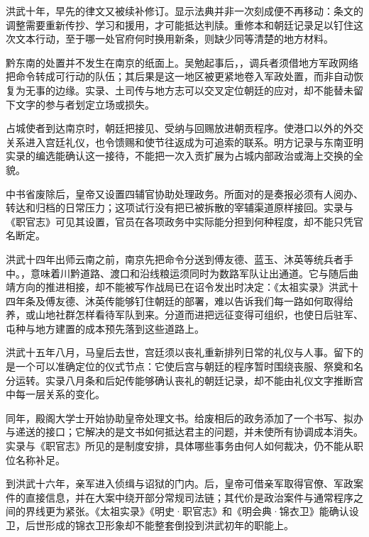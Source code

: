 洪武十年，早先的律文又被续补修订。显示法典并非一次刻成便不再移动：条文的调整需要重新传抄、学习和援用，才可能抵达判牍。重修本和朝廷记录足以钉住这次文本行动，至于哪一处官府何时换用新条，则缺少同等清楚的地方材料。

黔东南的处置并不发生在南京的纸面上。吴勉起事后，，调兵者须借地方军政网络把命令转成可行动的队伍；其后果是这一地区被更紧地卷入军政处置，而非自动恢复为无事的边缘。实录、土司传与地方志可以交叉定位朝廷的应对，却不能替未留下文字的参与者划定立场或损失。

占城使者到达南京时，朝廷把接见、受纳与回赐放进朝贡程序。使港口以外的外交关系进入宫廷礼仪，也令馈赐和使节往返成为可追索的联系。明方记录与东南亚明实录的编选能确认这一接待，不能把一次入贡扩展为占城内部政治或海上交换的全貌。

中书省废除后，皇帝又设置四辅官协助处理政务。所面对的是奏报必须有人阅办、转达和归档的日常压力；这项试行没有把已被拆散的宰辅渠道原样接回。实录与《职官志》可见其设置，官员在各项政务中实际能分担到何种程度，却不能只凭官名断定。

洪武十四年出师云南之前，南京先把命令分送到傅友德、蓝玉、沐英等统兵者手中。，意味着川黔道路、渡口和沿线粮运须同时为数路军队让出通道。它与随后曲靖方向的推进相接，却不能被写作战局已在诏令发出时决定：《太祖实录》洪武十四年条及傅友德、沐英传能够钉住朝廷的部署，难以告诉我们每一路如何取得给养，或山地社群怎样看待军队到来。分道而进把远征变得可组织，也使日后驻军、屯种与地方建置的成本预先落到这些道路上。

洪武十五年八月，马皇后去世，宫廷须以丧礼重新排列日常的礼仪与人事。留下的是一个可以准确定位的仪式节点：它使后宫与朝廷的程序暂时围绕丧服、祭奠和名分运转。实录八月条和后妃传能够确认丧礼的朝廷记录，却不能由礼仪文字推断宫中每一层关系的变化。

同年，殿阁大学士开始协助皇帝处理文书。给废相后的政务添加了一个书写、拟办与递送的接口；它解决的是文书如何抵达君主的问题，并未使所有协调成本消失。实录与《职官志》所见的是制度安排，具体哪些事务由何人如何裁决，仍不能从职位名称补足。

到洪武十六年，亲军进入侦缉与诏狱的门内。后，皇帝可借亲军取得官僚、军政案件的直接信息，并在大案中绕开部分常规司法链；其代价是政治案件与通常程序之间的界线更为紧张。《太祖实录》《明史·职官志》和《明会典·锦衣卫》能确认设卫，后世形成的锦衣卫形象却不能整套倒投到洪武初年的职能上。

